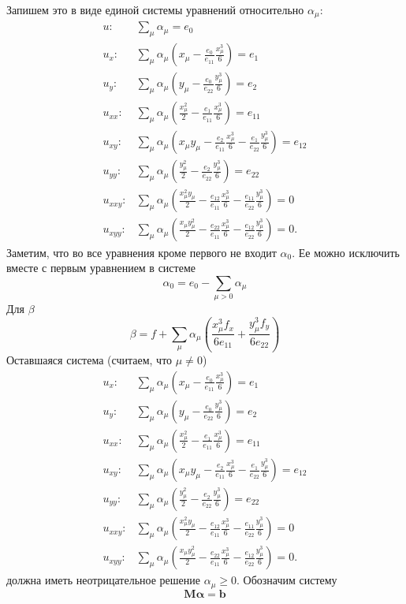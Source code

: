 \documentclass[12pt]{article}
\begin{document}
Запишем это в виде единой системы уравнений относительно $\alpha_\mu$:
\begin{align*}
u: &\sum_\mu \alpha_\mu = e_0\\
u_x: &\sum_\mu \alpha_\mu \left(x_\mu - \frac{e_0}{e_{11}}\frac{x_\mu^3}{6}\right) = e_1\\
u_y: &\sum_\mu \alpha_\mu \left(y_\mu - \frac{e_0}{e_{22}}\frac{y_\mu^3}{6}\right) = e_2\\
u_{xx}: &\sum_\mu \alpha_\mu \left(\frac{x_\mu^2}{2} - \frac{e_1}{e_{11}} \frac{x_\mu^3}{6} \right) = e_{11} \\
u_{xy}: &\sum_\mu \alpha_\mu \left(x_\mu y_\mu - \frac{e_2}{e_{11}} \frac{x_\mu^3}{6} - \frac{e_1}{e_{22}}\frac{y_\mu^3}{6}\right)= e_{12}\\
u_{yy}: &\sum_\mu \alpha_\mu \left(\frac{y_\mu^2}{2} - \frac{e_2}{e_{22}} \frac{y_\mu^3}{6}\right) = e_{22}\\
u_{xxy}: &\sum_\mu \alpha_\mu \left(\frac{x_\mu^2 y_\mu}{2} - \frac{e_{12}}{e_{11}}\frac{x_\mu^3}{6} - \frac{e_{11}}{e_{22}}\frac{y_\mu^3}{6}\right) = 0\\
u_{xyy}: &\sum_\mu \alpha_\mu \left(\frac{x_\mu y_\mu^2}{2} - \frac{e_{22}}{e_{11}}\frac{x_\mu^3}{6} - \frac{e_{12}}{e_{22}}\frac{y_\mu^3}{6}\right) = 0.
\end{align*}
Заметим, что во все уравнения кроме первого не входит $\alpha_0$. Ее можно исключить вместе с первым уравнением в системе
\[
\alpha_0 = e_0 - \sum_{\mu > 0} \alpha_\mu
\]
Для $\beta$
\[
\beta = f + \sum_\mu \alpha_\mu \left(\frac{x_\mu^3f_x}{6e_{11}} + \frac{y_\mu^3f_y}{6e_{22}}\right)
\]
Оставшаяся система (считаем, что $\mu \neq 0$)
\begin{align*}
	u_x: &\sum_\mu \alpha_\mu \left(x_\mu - \frac{e_0}{e_{11}}\frac{x_\mu^3}{6}\right) = e_1\\
	u_y: &\sum_\mu \alpha_\mu \left(y_\mu - \frac{e_0}{e_{22}}\frac{y_\mu^3}{6}\right) = e_2\\
	u_{xx}: &\sum_\mu \alpha_\mu \left(\frac{x_\mu^2}{2} - \frac{e_1}{e_{11}} \frac{x_\mu^3}{6} \right) = e_{11} \\
	u_{xy}: &\sum_\mu \alpha_\mu \left(x_\mu y_\mu - \frac{e_2}{e_{11}} \frac{x_\mu^3}{6} - \frac{e_1}{e_{22}}\frac{y_\mu^3}{6}\right)= e_{12}\\
	u_{yy}: &\sum_\mu \alpha_\mu \left(\frac{y_\mu^2}{2} - \frac{e_2}{e_{22}} \frac{y_\mu^3}{6}\right) = e_{22}\\
	u_{xxy}: &\sum_\mu \alpha_\mu \left(\frac{x_\mu^2 y_\mu}{2} - \frac{e_{12}}{e_{11}}\frac{x_\mu^3}{6} - \frac{e_{11}}{e_{22}}\frac{y_\mu^3}{6}\right) = 0\\
	u_{xyy}: &\sum_\mu \alpha_\mu \left(\frac{x_\mu y_\mu^2}{2} - \frac{e_{22}}{e_{11}}\frac{x_\mu^3}{6} - \frac{e_{12}}{e_{22}}\frac{y_\mu^3}{6}\right) = 0.
\end{align*}
должна иметь неотрицательное решение $\alpha_\mu \geqslant 0$. Обозначим систему
\[
\mathbf{M} \boldsymbol{\alpha} = \mathbf{b}
\]
\end{document}
